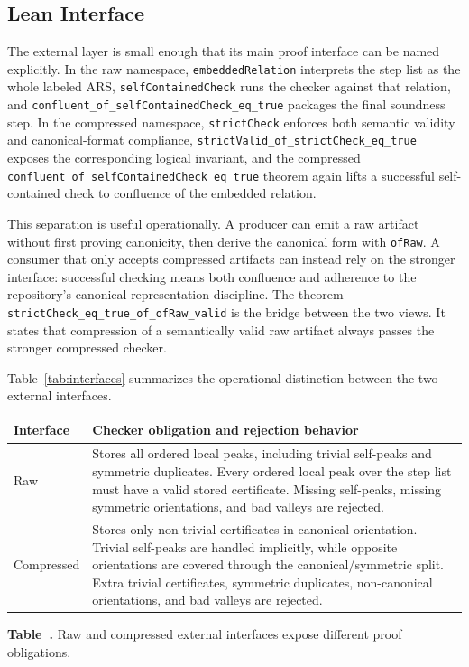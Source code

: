 \documentclass[submission,copyright,creativecommons]{eptcs}
\begin{document}
\subsection{Lean Interface}

The external layer is small enough that its main proof interface can be named
explicitly. In the raw namespace, \texttt{embeddedRelation} interprets the step
list as the whole labeled ARS, \texttt{selfContainedCheck} runs the checker
against that relation, and
\texttt{confluent\_of\_selfContainedCheck\_eq\_true} packages the final
soundness step. In the compressed namespace, \texttt{strictCheck} enforces both
semantic validity and canonical-format compliance,
\texttt{strictValid\_of\_strictCheck\_eq\_true} exposes the corresponding
logical invariant, and the compressed
\texttt{confluent\_of\_selfContainedCheck\_eq\_true} theorem again lifts a
successful self-contained check to confluence of the embedded relation.

This separation is useful operationally. A producer can emit a raw artifact
without first proving canonicity, then derive the canonical form with
\texttt{ofRaw}. A consumer that only accepts compressed artifacts can instead
rely on the stronger interface: successful checking means both confluence and
adherence to the repository's canonical representation discipline. The theorem
\texttt{strictCheck\_eq\_true\_of\_ofRaw\_valid} is the bridge between the two
views. It states that compression of a semantically valid raw artifact always
passes the stronger compressed checker.

Table~\ref{tab:interfaces} summarizes the operational distinction between the
two external interfaces.

\begin{center}
\label{tab:interfaces}
\small
\begin{tabular}{>{\raggedright\arraybackslash}p{1.75cm}>{\raggedright\arraybackslash}p{9.0cm}}
\toprule
Interface & Checker obligation and rejection behavior \\
\midrule
Raw & Stores all ordered local peaks, including trivial self-peaks and symmetric duplicates.
Every ordered local peak over the step list must have a valid stored certificate.
Missing self-peaks, missing symmetric orientations, and bad valleys are rejected. \\
\midrule
Compressed & Stores only non-trivial certificates in canonical orientation. Trivial
self-peaks are handled implicitly, while opposite orientations are covered through
the canonical/symmetric split. Extra trivial certificates, symmetric duplicates,
non-canonical orientations, and bad valleys are rejected. \\
\bottomrule
\end{tabular}

\smallskip
\textbf{Table~\thetable.} Raw and compressed external interfaces expose different proof obligations.
\end{center}
\end{document}
